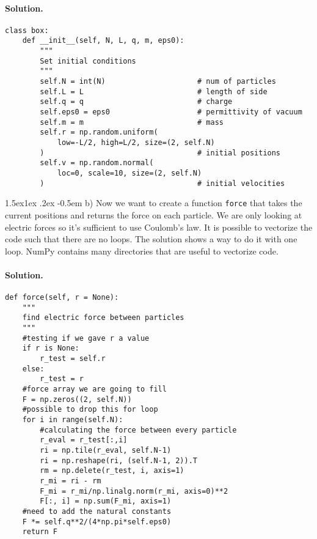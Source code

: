 \documentclass[%
oneside,                 %
final,                   %
10pt]{article}
\makeatletter
\newenvironment{doconceexercise}{}{}
\newcommand\subex{\@startsection{paragraph}{4}{\z@}%
                  {1.5ex\@plus1ex \@minus.2ex}%
                  {-0.5em}%
                  {\normalfont\normalsize\bfseries}}
\makeatother
\begin{document}
\begin{doconceexercise}
\paragraph{Solution.}
\begin{verbatim}
class box:
    def __init__(self, N, L, q, m, eps0):
        """
        Set initial conditions
        """
        self.N = int(N)                     # num of particles
        self.L = L                          # length of side
        self.q = q                          # charge
        self.eps0 = eps0                    # permittivity of vacuum
        self.m = m                          # mass
        self.r = np.random.uniform(
            low=-L/2, high=L/2, size=(2, self.N)
        )                                   # initial positions
        self.v = np.random.normal(
            loc=0, scale=10, size=(2, self.N)
        )                                   # initial velocities
\end{verbatim}


\subex{b)}
Now we want to create a function \texttt{force} that takes the current positions and returns the force on each particle. We are only looking at electric forces so it's sufficient to use Coulomb's law. It is possible to vectorize the code such that there are no loops. The solution shows a way to do it with one loop. NumPy contains many directories that are useful to vectorize code.


\paragraph{Solution.}
\begin{verbatim}
def force(self, r = None):
    """
    find electric force between particles
    """
    #testing if we gave r a value
    if r is None:
        r_test = self.r
    else:
        r_test = r
    #force array we are going to fill
    F = np.zeros((2, self.N))
    #possible to drop this for loop
    for i in range(self.N):
        #calculating the force between every particle
        r_eval = r_test[:,i]
        ri = np.tile(r_eval, self.N-1)
        ri = np.reshape(ri, (self.N-1, 2)).T
        rm = np.delete(r_test, i, axis=1)
        r_mi = ri - rm
        F_mi = r_mi/np.linalg.norm(r_mi, axis=0)**2
        F[:, i] = np.sum(F_mi, axis=1)
    #need to add the natural constants
    F *= self.q**2/(4*np.pi*self.eps0)
    return F
\end{verbatim}


\end{doconceexercise}
\end{document}
